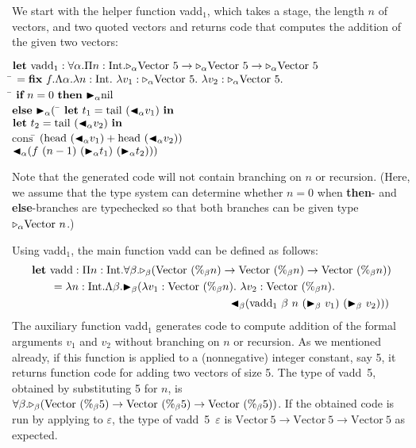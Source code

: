 We start with the helper function vadd$_1$, which takes a stage, the length $n$ of vectors, and two quoted vectors and returns code that computes the addition of the given two vectors:
%
\begin{tabbing}
	  $\textbf{let}\ \text{vadd}_1 : \F\alpha.\Pi n:\I.\TW_\alpha\Vpn\to\TW_\alpha\Vpn\to\TW_\alpha\Vpn$                                \\
	  \hspace{6mm} \= $= \textbf{fix}\ f.\Lambda\alpha.\lambda n:\I.\ \lambda v_1:\TW_\alpha\Vpn.\ \lambda v_2:\TW_\alpha\Vpn.$            \\
	  \> \hspace{6mm} \= $\textbf{if}\ n = 0 \ \textbf{then}\ {\mathop{\blacktriangleright}}_\alpha \text{nil}$ \\
	  \>\> $\textbf{else}\ {\mathop{\blacktriangleright}}_\alpha ($ \= $\textbf{let}\ t_1 = \text{tail}\ ({\mathop{\blacktriangleleft}}_\alpha v_1)\ \textbf{in}$ \\
	  \>\>\> $\textbf{let}\ t_2 = \text{tail}\ ({\mathop{\blacktriangleleft}}_\alpha v_2)\ \textbf{in}$ \\
          \>\>\> $\text{cons}\ $\= $(\text{head}\ ({\mathop{\blacktriangleleft}}_\alpha v_1) + \text{head} \ ({\mathop{\blacktriangleleft}}_\alpha v_2))$ \\
          \>\>\>\> ${\mathop{\blacktriangleleft}}_\alpha (f\ (n-1)\ ({\mathop{\blacktriangleright}}_\alpha t_1)\ ({\mathop{\blacktriangleright}}_\alpha t_2)))$
\end{tabbing}
Note that the generated code will not contain branching on $n$ or recursion.
(Here, we assume that the type system can determine whether $n=0$ when
\textbf{then}- and \textbf{else}-branches are typechecked so that
both branches can be given type \({\mathop{\triangleright}}_\alpha \text{Vector }n\).)

Using vadd$_1$, the main function vadd can be defined as follows:
\renewcommand{\Vpn}{\text{Vector}\ (\%_\beta n)}
\begin{align*}
	  & \textbf{let}\ \text{vadd}: \Pi n:\I.\F\beta.\TW_\beta(\Vpn\to\Vpn\to\Vpn)                \\ 
	  & \hspace{6mm} = \lambda n:\I.\Lambda\beta.\TB_\beta (\lambda v_1:\Vpn.\ \lambda v_2:\Vpn. \\
	  & \hspace{63mm} \TBL_\beta (\text{vadd}_1\ \beta\ n\ (\TB_\beta\ v_1)\ (\TB_\beta\ v_2))) 
\end{align*}
\renewcommand{\Vpn}{\text{Vector}\ (\%_\beta 5)}%
The auxiliary function vadd$_1$ generates code to compute addition of
the formal arguments $v_1$ and $v_2$ without branching on $n$ or recursion.
As we mentioned already, if this function is applied to a
(nonnegative) integer constant, say 5, it returns function code for adding
two vectors of size 5.  The type of vadd\ 5, obtained by
substituting 5 for $n$, is
$\F\beta.\TW_\beta(\Vpn\to\Vpn\to\Vpn)$.
\renewcommand{\Vpn}{\text{Vector}\ 5}
If the obtained code is run by applying to \(\varepsilon\),
the type of vadd\ 5\ $\varepsilon$ is
\(\Vpn\to\Vpn\to\Vpn\) as expected.

